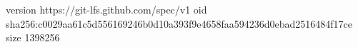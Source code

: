 version https://git-lfs.github.com/spec/v1
oid sha256:c0029aa61c5d556169246b0d10a393f9e4658faa594236d0ebad2516484f17ce
size 1398256
